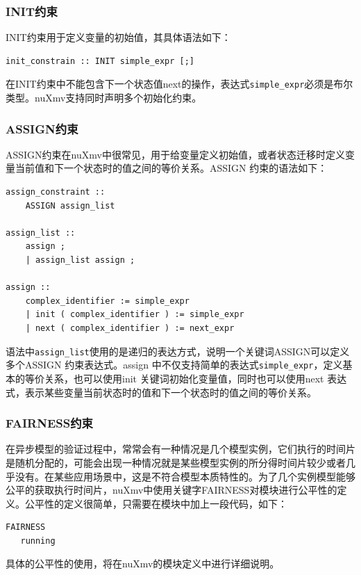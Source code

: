 \subsubsection{INIT约束}
INIT约束用于定义变量的初始值，其具体语法如下：

\begin{lstlisting}
init_constrain :: INIT simple_expr [;]
\end{lstlisting}

在INIT约束中不能包含下一个状态值next的操作，表达式\verb|simple_expr|必须是布尔类型。nuXmv支持同时声明多个初始化约束。

\subsubsection{ASSIGN约束}
ASSIGN约束在nuXmv中很常见，用于给变量定义初始值，或者状态迁移时定义变量当前值和下一个状态时的值之间的等价关系。ASSIGN 约束的语法如下：

\begin{lstlisting}
assign_constraint ::
    ASSIGN assign_list

assign_list ::
    assign ;
    | assign_list assign ;

assign ::
    complex_identifier := simple_expr
    | init ( complex_identifier ) := simple_expr
    | next ( complex_identifier ) := next_expr
\end{lstlisting}

语法中\verb|assign_list|使用的是递归的表达方式，说明一个关键词ASSIGN可以定义多个ASSIGN 约束表达式。assign 中不仅支持简单的表达式\verb|simple_expr|，定义基本的等价关系，也可以使用init 关键词初始化变量值，同时也可以使用next 表达式，表示某些变量当前状态时的值和下一个状态时的值之间的等价关系。

\subsubsection{FAIRNESS约束}
在异步模型的验证过程中，常常会有一种情况是几个模型实例，它们执行的时间片是随机分配的，可能会出现一种情况就是某些模型实例的所分得时间片较少或者几乎没有。在某些应用场景中，这是不符合模型本质特性的。为了几个实例模型能够公平的获取执行时间片，nuXmv中使用关键字FAIRNESS对模块进行公平性的定义。公平性的定义很简单，只需要在模块中加上一段代码，如下：

\begin{lstlisting}
FAIRNESS
   running
\end{lstlisting}

具体的公平性的使用，将在nuXmv的模块定义中进行详细说明。



